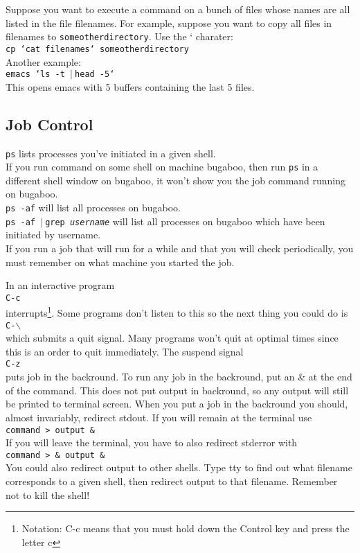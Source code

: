 \documentclass{article}
\newcommand{\pipe}{$|\:$}
\begin{document}
Suppose you want to execute a command on a bunch of files whose names are
all listed in the file filenames.  For example, suppose you want to 
copy all files in filenames to {\tt someotherdirectory}.  Use the ` charater: \\
{\tt cp `cat filenames` someotherdirectory}\\
Another example: \\
{\tt emacs `ls -t \pipe head -5`} \\
This opens emacs with 5 buffers containing the last 5 files.

\subsection{Job Control}
\label{sec:jobcontrol}
{\tt ps} lists processes you've initiated in a given shell.\\
If you run command on some shell on machine bugaboo, then run
{\tt ps} in a different shell window on bugaboo, it won't show you the job
command running on bugaboo.\\
{\tt ps -af} will list all processes on bugaboo. \\
{\tt ps -af \pipe grep \emph{username}} will list all processes on bugaboo which have
been initiated by username. \\
If you run a job that will run for a while and that you will check
periodically, you must remember on what machine you started the job.

In an interactive program \\
{\tt C-c} \\
interrupts\footnote{Notation: C-c means that you must hold down the Control key
  and press the letter c}. 
Some programs don't listen to this so the next thing you could do is\\ 
{\tt C-$\backslash$}  \\
which submits a quit signal. Many programs won't quit at optimal times
since this is an order to quit immediately.  The suspend signal\\
{\tt C-z}\\
puts job in the backround. 
To run any job in the backround, put an \& at the end of the command.  This does not
put output in backround, so any output will still be printed to terminal screen.
When you put a job in the backround you should, almost invariably, redirect stdout.
If you will remain at the terminal use \\
{\tt command >  output \& }\\
If you will leave the terminal, you have to also redirect stderror with \\
{\tt command > \& output \&}\\
You could also redirect output to other shells.  Type tty to find out what filename
corresponds to a given shell, then redirect output to that filename.  Remember not to kill
the shell!
\end{document}

